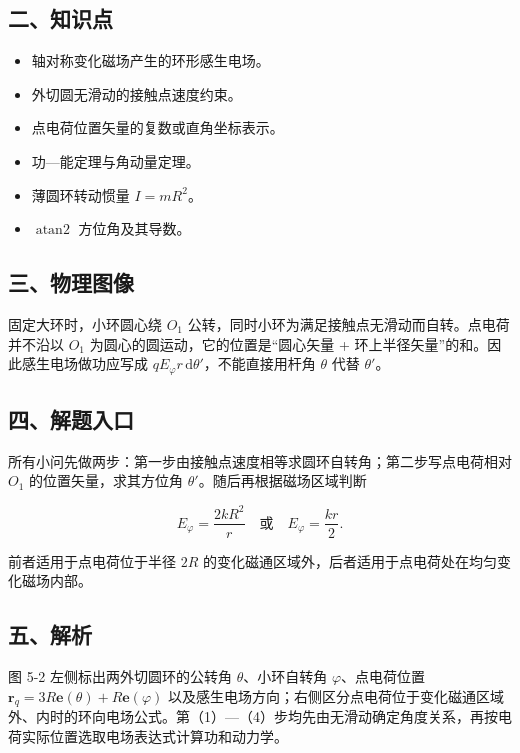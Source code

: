 \documentclass[12pt,a4paper,UTF8]{ctexart}
\newcommand{\tightlist}{\setlength{\itemsep}{0pt}\setlength{\parskip}{0pt}}
\begin{document}
\subsection{二、知识点}\label{ux4e8cux77e5ux8bc6ux70b9-4}

\begin{itemize}
\tightlist
\item
  轴对称变化磁场产生的环形感生电场。
\item
  外切圆无滑动的接触点速度约束。
\item
  点电荷位置矢量的复数或直角坐标表示。
\item
  功---能定理与角动量定理。
\item
  薄圆环转动惯量 \(I=mR^2\)。
\item
  \(\operatorname{atan2}\) 方位角及其导数。
\end{itemize}

\subsection{三、物理图像}\label{ux4e09ux7269ux7406ux56feux50cf-4}

固定大环时，小环圆心绕 \(O_1\)
公转，同时小环为满足接触点无滑动而自转。点电荷并不沿以 \(O_1\)
为圆心的圆运动，它的位置是``圆心矢量 +
环上半径矢量''的和。因此感生电场做功应写成
\(qE_\varphi r\,\mathrm d\theta'\)，不能直接用杆角 \(\theta\) 代替
\(\theta'\)。

\subsection{四、解题入口}\label{ux56dbux89e3ux9898ux5165ux53e3-4}

所有小问先做两步：第一步由接触点速度相等求圆环自转角；第二步写点电荷相对
\(O_1\) 的位置矢量，求其方位角 \(\theta'\)。随后再根据磁场区域判断

\[E_\varphi=\frac{2kR^2}{r}\quad\text{或}\quad E_\varphi=\frac{kr}{2}.\]

前者适用于点电荷位于半径 \(2R\)
的变化磁通区域外，后者适用于点电荷处在均匀变化磁场内部。

\subsection{五、解析}\label{ux4e94ux89e3ux6790-4}

图 5-2 左侧标出两外切圆环的公转角 \(\theta\)、小环自转角
\(\varphi\)、点电荷位置 \(\bm r_q=3R\bm e(\theta)+R\bm e(\varphi)\)
以及感生电场方向；右侧区分点电荷位于变化磁通区域外、内时的环向电场公式。第（1）---（4）步均先由无滑动确定角度关系，再按电荷实际位置选取电场表达式计算功和动力学。
\end{document}
